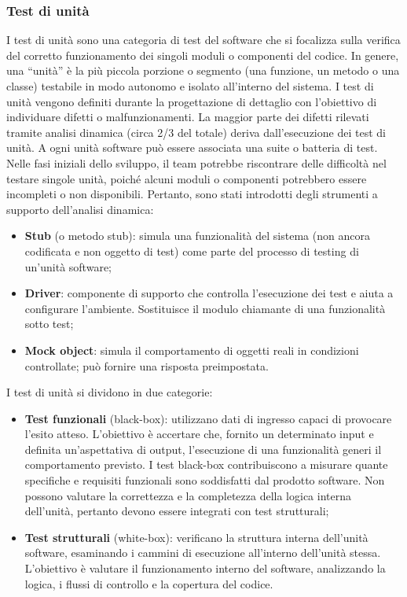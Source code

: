 \subsubsection{Test di unità}
\par I test di unità sono una categoria di test del software che si focalizza sulla verifica del corretto funzionamento dei singoli moduli o componenti del codice. In genere, una “unità” è la più piccola porzione o segmento (una funzione, un metodo o una classe) testabile in modo autonomo e isolato all’interno del sistema. I test di unità vengono definiti durante la progettazione di dettaglio con l’obiettivo di individuare difetti o malfunzionamenti. La maggior parte dei difetti rilevati tramite analisi dinamica (circa 2/3 del totale) deriva dall’esecuzione dei test di unità. A ogni unità software può essere associata una suite o batteria di test. Nelle fasi iniziali dello sviluppo, il team potrebbe riscontrare delle difficoltà nel testare singole unità, poiché alcuni moduli o componenti potrebbero essere incompleti o non disponibili. Pertanto, sono stati introdotti degli strumenti a supporto dell'analisi dinamica:
\begin{itemize}
  \item \textbf{Stub} (o metodo stub): simula una funzionalità del sistema (non ancora codificata e non oggetto di test) come parte del processo di testing di un’unità software;
  \item \textbf{Driver}: componente di supporto che controlla l'esecuzione dei test e aiuta a configurare l'ambiente. Sostituisce il modulo chiamante di una funzionalità sotto test;
  \item \textbf{Mock object}: simula il comportamento di oggetti reali in condizioni controllate; può fornire una risposta preimpostata.
\end{itemize}

\vspace{0.5\baselineskip}
\par I test di unità si dividono in due categorie:
\begin{itemize}
  \item \textbf{Test funzionali} (black-box): utilizzano dati di ingresso capaci di provocare l’esito atteso. L'obiettivo è accertare che, fornito un determinato input e definita un'aspettativa di output, l'esecuzione di una funzionalità generi il comportamento previsto. I test black-box contribuiscono a misurare quante specifiche e requisiti funzionali sono soddisfatti dal prodotto software. Non possono valutare la correttezza e la completezza della logica interna dell’unità, pertanto devono essere integrati con test strutturali;
  \item \textbf{Test strutturali} (white-box): verificano la struttura interna dell’unità software, esaminando i cammini di esecuzione all’interno dell’unità stessa. L'obiettivo è valutare il funzionamento interno del software, analizzando la logica, i flussi di controllo e la copertura del codice.
\end{itemize}

